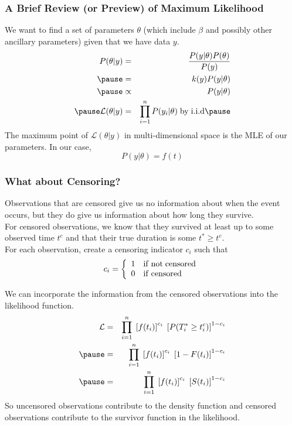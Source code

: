 \documentclass[handout]{beamer}
\begin{document}
\begin{frame}
\frametitle{A Brief Review (or Preview) of Maximum Likelihood}
\pause
We want to find a set of parameters $\theta$ (which include $\beta$
and possibly other ancillary parameters) given that we have data $y$.
\pause
\begin{eqnarray*}
P(\theta | y) &=& \frac{P(y|\theta)P(\theta)}{P(y)}\\
\pause
 &=& k(y) P(y|\theta)\\
\pause
&\propto& P(y|\theta)\\
\pause
\mathcal{L}(\theta | y) &=& \prod_{i=1}^n P(y_i|\theta) \; \mathrm{by \; i.i.d}
\pause
\end{eqnarray*}
The maximum point of $\mathcal{L}(\theta | y)$ in multi-dimensional space is the
MLE of our parameters.  \pause In our case,
\begin{equation*}
P(y|\theta) = f(t)
\end{equation*}
\end{frame}

\begin{frame}
\frametitle{What about Censoring?}
\pause
Observations that are censored give us no information about when the
event occurs, but they do give us information about how long they survive.\\
\pause
\bigskip
For censored observations, we know that they survived at least up to some
observed time $t^c$ and that their true duration is some $t^* \ge t^c$.\\
\pause
\bigskip
For each observation, create a censoring indicator $c_i$ such that 
\begin{eqnarray*}
c_i = \left \lbrace \begin{array}{l l}1 & \mathrm{if \; not \; censored}\\
0 & \mathrm{if \; censored}\end{array} \right.
\end{eqnarray*}
\end{frame}

\begin{frame}
We can incorporate the information from the censored observations into
the likelihood function.
\pause
\begin{eqnarray*}
\mathcal{L} &=& \prod^n_{i=1} \; \left[ f(t_i) \right] ^
{c_i} \; \left[ P(T_i^* \ge t_i^c) \right] ^ {1 - c_i}\\
\pause
&=& \prod^n_{i=1} \; \left[ f(t_i) \right] ^
{c_i} \; \left[ 1 - F(t_i) \right] ^ {1 - c_i} \\ 
\pause
&=& \prod^n_{i=1} \; \left[ f(t_i) \right] ^
{c_i} \; \left[ S(t_i) \right] ^ {1 - c_i} \\  
\end{eqnarray*}
\pause
So uncensored observations contribute to the density function and
censored observations contribute to the survivor function in the likelihood.
\end{frame}
\end{document}
